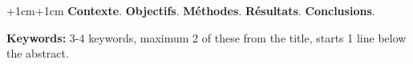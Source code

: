 
\abstract
\begin{changemargin}{+1cm}{+1cm}
\noindent
\textbf{Contexte}. \newline
\textbf{Objectifs}. \newline
\textbf{Méthodes}. \newline
\textbf{Résultats}. \newline
\textbf{Conclusions}. 

\par\vspace {1cm}
\noindent
\textbf{Keywords:} 3-4 keywords, maximum 2 of these from the title, starts 1 line
below the abstract.

\end{changemargin}
